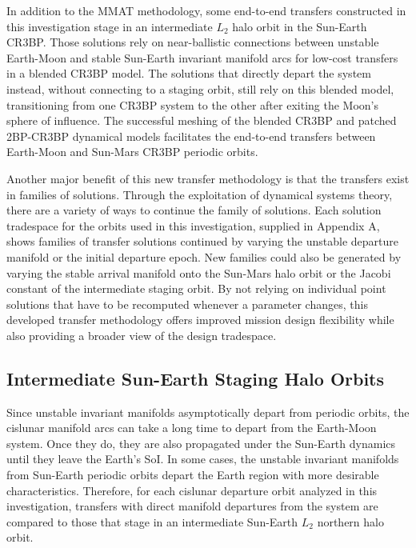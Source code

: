 In addition to the MMAT methodology, some end-to-end transfers constructed in this investigation
stage in an intermediate $L_{2}$ halo orbit in the Sun-Earth CR3BP. Those solutions rely on
near-ballistic connections between unstable Earth-Moon and stable Sun-Earth invariant manifold arcs
for low-cost transfers in a blended CR3BP model. The solutions that directly depart the system
instead, without connecting to a staging orbit, still rely on this blended model, transitioning
from one CR3BP system to the other after exiting the Moon's sphere of influence. The successful
meshing of the blended CR3BP and patched 2BP-CR3BP dynamical models facilitates the end-to-end
transfers between Earth-Moon and Sun-Mars CR3BP periodic orbits.

Another major benefit of this new transfer methodology is that the transfers exist in families of
solutions. Through the exploitation of dynamical systems theory, there are a variety of ways to
continue the family of solutions. Each solution tradespace for the orbits used in this
investigation, supplied in Appendix A, shows families of transfer solutions continued by varying
the unstable departure manifold or the initial departure epoch. New families could also be
generated by varying the stable arrival manifold onto the Sun-Mars halo orbit or the Jacobi
constant of the intermediate staging orbit. By not relying on individual point solutions that have
to be recomputed whenever a parameter changes, this developed transfer methodology offers improved
mission design flexibility while also providing a broader view of the design tradespace.

\subsection{Intermediate Sun-Earth Staging Halo Orbits}
Since unstable invariant manifolds asymptotically depart from periodic orbits, the cislunar
manifold arcs can take a long time to depart from the Earth-Moon system. Once they do, they are
also propagated under the Sun-Earth dynamics until they leave the Earth's SoI. In some cases, the
unstable invariant manifolds from Sun-Earth periodic orbits depart the Earth region with more
desirable characteristics. Therefore, for each cislunar departure orbit analyzed in this
investigation, transfers with direct manifold departures from the system are compared to those that
stage in an intermediate Sun-Earth $L_{2}$ northern halo orbit.

